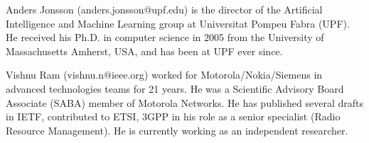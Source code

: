\documentclass[journal]{IEEEtran}
\begin{document}
\begin{IEEEbiographynophoto}{Anders Jonsson}
(anders.jonsson@upf.edu) is the director of the Artificial Intelligence and Machine Learning group at Universitat Pompeu Fabra (UPF). He received his Ph.D. in computer science in 2005 from the University of Massachusetts Amherst, USA, and has been at UPF ever since.
\end{IEEEbiographynophoto}

\begin{IEEEbiographynophoto}{Vishnu Ram}
(vishnu.n@ieee.org) worked for Motorola/Nokia/Siemens in advanced technologies teams for 21 years. He was a Scientific Advisory Board Associate (SABA) member of Motorola Networks. He has published several drafts in IETF, contributed to ETSI, 3GPP in his role as a senior specialist (Radio Resource Management). He is currently working as an independent researcher.	
\end{IEEEbiographynophoto}

\vfill
\end{document}
